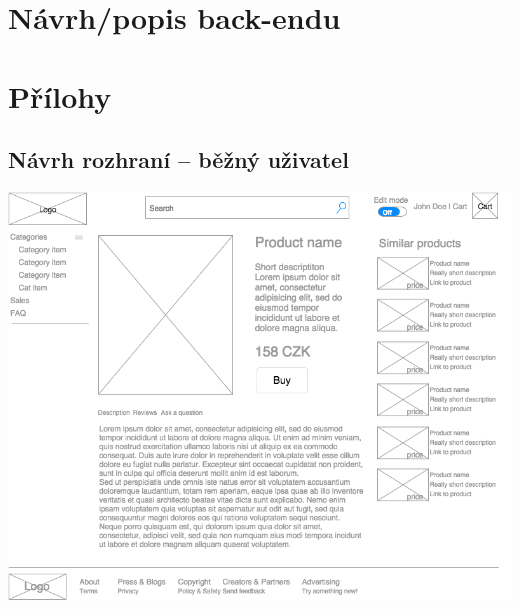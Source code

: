 \documentclass[11pt,a4paper]{article}
\begin{document}
\section*{Návrh/popis back-endu}




\section*{Přílohy}

\subsection*{Návrh rozhraní -- běžný uživatel}
\includegraphics[scale=0.6]{pyngshop.png}
\end{document}
